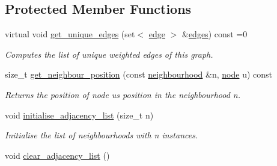 \subsection*{Protected Member Functions}
\begin{DoxyCompactItemize}
\item 
virtual void \hyperlink{classlgraph_1_1utils_1_1uxgraph_a042795f5d307b07396da89d50734234a}{get\+\_\+unique\+\_\+edges} (set$<$ \hyperlink{namespacelgraph_1_1utils_a6510284ce1b1ae5dc97ce5d2de426e10}{edge} $>$ \&\hyperlink{classlgraph_1_1utils_1_1uxgraph_ade877f3a9cf71d844cfe7b6c4f8aae10}{edges}) const =0
\begin{DoxyCompactList}\small\item\em Computes the list of unique weighted edges of this graph. \end{DoxyCompactList}\item 
size\+\_\+t \hyperlink{classlgraph_1_1utils_1_1xxgraph_aac7ef2134cad9529869f1334de7892d9}{get\+\_\+neighbour\+\_\+position} (const \hyperlink{namespacelgraph_1_1utils_a0f2ef47028a466d26841709e705390ac}{neighbourhood} \&n, \hyperlink{namespacelgraph_1_1utils_a7bd66ede3805ef121bc2835bd48de0cf}{node} u) const 
\begin{DoxyCompactList}\small\item\em Returns the position of node {\itshape u\textquotesingle{}s} position in the neighbourhood {\itshape n}. \end{DoxyCompactList}\item 
void \hyperlink{classlgraph_1_1utils_1_1xxgraph_a2201aaff5e9ffa29a9b3abfde705dd46}{initialise\+\_\+adjacency\+\_\+list} (size\+\_\+t n)\hypertarget{classlgraph_1_1utils_1_1xxgraph_a2201aaff5e9ffa29a9b3abfde705dd46}{}\label{classlgraph_1_1utils_1_1xxgraph_a2201aaff5e9ffa29a9b3abfde705dd46}

\begin{DoxyCompactList}\small\item\em Initialise the list of neighbourhoods with {\itshape n} instances. \end{DoxyCompactList}\item 
void \hyperlink{classlgraph_1_1utils_1_1xxgraph_a6523402d0ec66918b95de23d2bee38fc}{clear\+\_\+adjacency\+\_\+list} ()\hypertarget{classlgraph_1_1utils_1_1xxgraph_a6523402d0ec66918b95de23d2bee38fc}{}\label{classlgraph_1_1utils_1_1xxgraph_a6523402d0ec66918b95de23d2bee38fc}


\end{DoxyCompactItemize}
